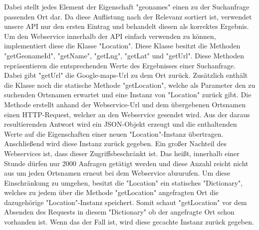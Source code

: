 Dabei stellt jedes Element der Eigenschaft "{}geonames"{} einen zu der Suchanfrage passenden Ort dar. Da diese Auflistung nach der Relevanz sortiert ist, verwendet unsere API nur den ersten Eintrag und behandelt diesen als korrektes Ergebnis. Um den Webservice innerhalb der API einfach verwenden zu k\"{o}nnen, implementiert diese die Klasse "{}Location"{}. Diese Klasse besitzt die Methoden "{}getGeonameId"{}, "{}getName"{}, "{}getLng"{}, "{}getLat"{} und "{}getUrl"{}. Diese Methoden repr\"{a}sentieren die entsprechenden Werte des Ergebnisses einer Suchanfrage. Dabei gibt "{}getUrl"{} die Google-maps-Url zu dem Ort zur\"uck. Zus\"atzlich enth\"alt die Klasse noch die statische Methode "{}getLocation"{}, welche als Parameter den zu suchenden Ortsnamen erwartet und eine Instanz von "{}Location"{} zur\"uck gibt. Die Methode erstellt anhand der Webservice-Url und dem \"ubergebenen Ortsnamen einen HTTP-Request, welcher an den Webservice gesendet wird. Aus der daraus resultierenden Antwort wird ein JSON-Objekt erzeugt und die enthaltenden Werte auf die Eigenschaften einer neuen "{}Location"{}-Instanz \"ubertragen. Anschlie{\ss}end wird diese Instanz zur\"uck gegeben. Ein gro{\ss}er Nachteil des Webservices ist, dass dieser Zugriffsbeschr\"{a}nkt ist. Das hei{\ss}t, innerhalb einer Stunde d\"urfen nur 2000 Anfragen get\"{a}tigt werden und diese Anzahl reicht nicht aus um jeden Ortsnamen erneut bei dem Webservice abzurufen. Um diese Einschr\"{a}nkung zu umgehen, besitzt die "{}Location"{} ein statisches "{}Dictionary"{}, welches zu jedem \"uber die Methode "{}getLocation"{} angefragten Ort die dazugeh\"orige "{}Location"{}-Instanz speichert. Somit schaut "{}getLocation"{} vor dem Absenden des Requests in diesem "{}Dictionary"{} ob der angefragte Ort schon vorhanden ist. Wenn das der Fall ist, wird diese gecachte Instanz zur\"uck gegeben.

